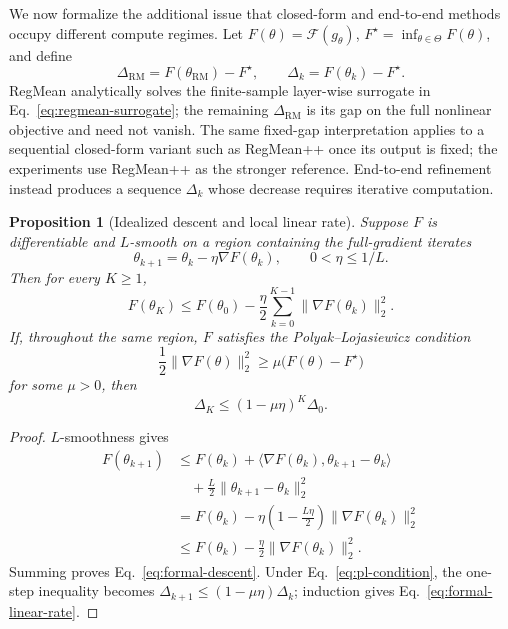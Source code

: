 \documentclass[letterpaper]{article} %
\theoremstyle{plain}
\newtheorem{proposition}[theorem]{Proposition}
\theoremstyle{definition}
\begin{document}
We now formalize the additional issue that closed-form and end-to-end methods occupy different compute regimes.
Let $F(\theta)=\mathcal F(g_\theta)$, $F^\star=\inf_{\theta\in\Theta}F(\theta)$, and define
\begin{equation}
\Delta_{\mathrm{RM}}=F(\theta_{\mathrm{RM}})-F^\star,
\qquad
\Delta_k=F(\theta_k)-F^\star.
\label{eq:formal-gaps}
\end{equation}
RegMean analytically solves the finite-sample layer-wise surrogate in Eq.~\eqref{eq:regmean-surrogate}; the remaining $\Delta_{\mathrm{RM}}$ is its gap on the full nonlinear objective and need not vanish.
The same fixed-gap interpretation applies to a sequential closed-form variant such as RegMean++ once its output is fixed; the experiments use RegMean++ as the stronger reference.
End-to-end refinement instead produces a sequence $\Delta_k$ whose decrease requires iterative computation.

\begin{proposition}[Idealized descent and local linear rate]
\label{prop:compute-error-formal}
Suppose $F$ is differentiable and $L$-smooth on a region containing the full-gradient iterates
\begin{equation}
\theta_{k+1}=\theta_k-\eta\nabla F(\theta_k),
\qquad 0<\eta\le 1/L.
\label{eq:idealized-gd}
\end{equation}
Then for every $K\ge1$,
\begin{equation}
F(\theta_K)
\le
F(\theta_0)-\frac{\eta}{2}
\sum_{k=0}^{K-1}\|\nabla F(\theta_k)\|_2^2.
\label{eq:formal-descent}
\end{equation}
If, throughout the same region, $F$ satisfies the Polyak--Lojasiewicz condition
\begin{equation}
\frac12\|\nabla F(\theta)\|_2^2
\ge \mu\bigl(F(\theta)-F^\star\bigr)
\label{eq:pl-condition}
\end{equation}
for some $\mu>0$, then
\begin{equation}
\Delta_K\le(1-\mu\eta)^K\Delta_0.
\label{eq:formal-linear-rate}
\end{equation}
\end{proposition}

\begin{proof}
$L$-smoothness gives
\begin{align*}
F(\theta_{k+1})
&\le F(\theta_k)
+\langle\nabla F(\theta_k),
  \theta_{k+1}-\theta_k\rangle \\
&\quad +\frac L2
  \|\theta_{k+1}-\theta_k\|_2^2 \\
&=F(\theta_k)-\eta\left(1-\frac{L\eta}{2}\right)
  \|\nabla F(\theta_k)\|_2^2 \\
&\le F(\theta_k)-\frac\eta2
  \|\nabla F(\theta_k)\|_2^2.
\end{align*}
Summing proves Eq.~\eqref{eq:formal-descent}.
Under Eq.~\eqref{eq:pl-condition}, the one-step inequality becomes $\Delta_{k+1}\le(1-\mu\eta)\Delta_k$; induction gives Eq.~\eqref{eq:formal-linear-rate}.
\end{proof}
\end{document}

